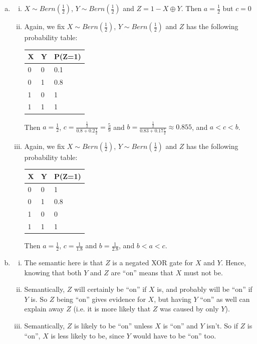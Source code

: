 \documentclass[paper=a4, fontsize=11pt]{scrartcl} %
\numberwithin{equation}{section} %
\numberwithin{figure}{section} %
\numberwithin{table}{section} %
\begin{document}
\begin{enumerate}[(a)]
	\item \begin{enumerate}[(i)]
			\item $X \sim Bern\left(\frac{1}{2}\right)$, $Y \sim Bern\left(\frac{1}{2}\right)$ and $Z = 1 - X \oplus Y$. Then $a=\frac{1}{2}$ but $c=0$
			
				
			\item Again, we fix $X \sim Bern\left(\frac{1}{2}\right)$, $Y \sim Bern\left(\frac{1}{2}\right)$ and $Z$ has the following probability table:
			\begin{center}
				\begin{tabular}{*3l}  
					\toprule
					X & Y & P(Z=1) \\ \midrule
					0 & 0 & 0.1\\
					0 & 1 & 0.8\\
					1 & 0 & 1\\
					1 & 1 & 1	
					\\\bottomrule
					\end{tabular}
			\end{center}
				Then $a=\frac{1}{2}$, $c=\frac{\frac{1}{2}}{0.8 + 0.2\frac{1}{2}}=\frac{5}{9}$ and $b=\frac{\frac{1}{2}}{0.83 + 0.17\frac{1}{2}}\approx0.855$, and $a<c<b$.
			\item  Again, we fix $X \sim Bern\left(\frac{1}{2}\right)$, $Y \sim Bern\left(\frac{1}{2}\right)$ and $Z$ has the following probability table:
			\begin{center}
				\begin{tabular}{*3l}  
					\toprule
					X & Y & P(Z=1) \\ \midrule
					0 & 0 & 1\\
					0 & 1 & 0.8\\
					1 & 0 & 0\\
					1 & 1 & 1	
					\\\bottomrule
				\end{tabular}
			\end{center}
			Then $a=\frac{1}{2}$, $c=\frac{1}{1.8}$ and $b=\frac{1}{2.8}$, and $b<a<c$.
			
			\end{enumerate}
			
	\item \begin{enumerate}[(i)]
		\item The semantic here is that $Z$ is a negated XOR gate for $X$ and $Y$.
		Hence, knowing that both $Y$ and $Z$ are ``on'' means that $X$ must not be.
		\item Semantically, $Z$ will certainly be ``on'' if $X$ is, and probably will be ``on'' if $Y$ is. So $Z$ being ``on'' gives evidence for $X$, but having $Y$ ``on'' as well can explain away $Z$ (i.e. it is more likely that $Z$ was caused by only $Y$).
		\item Semantically, $Z$ is likely to be ``on'' unless $X$ is ``on'' and $Y$ isn't. So if $Z$ is ``on'', $X$ is less likely to be, since $Y$ would have to be ``on'' too.
		  \end{enumerate}	
\end{enumerate}
\end{document}
